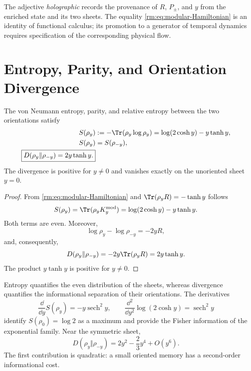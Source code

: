 The adjective \emph{holographic} records the provenance of \(R\),
\(P_\pm\), and \(y\) from the enriched state and its two sheets. The equality
\cref{rm:eq:modular-Hamiltonian} is an identity of functional calculus; its
promotion to a generator of temporal dynamics requires specification of the
corresponding physical flow.

\section{Entropy, Parity, and Orientation Divergence}

\begin{theorem}
\label{rm:thm:modular-information-geometry}
The von Neumann entropy, parity, and relative entropy between the
two orientations satisfy
\begin{align}
 S(\rho_y)
 &:=-\Tr(\rho_y\log\rho_y)
 =\log(2\cosh y)-y\tanh y,
 \label{rm:eq:modular-entropy}\\
 S(\rho_y)&=S(\rho_{-y}),
 \label{rm:eq:modular-entropy-even}\\
 \boxed{
 D(\rho_y\Vert\rho_{-y})
 =2y\tanh y.}
 \label{rm:eq:modular-relative-entropy}
\end{align}
The divergence is positive for \(y\ne0\) and vanishes exactly on the
unoriented sheet \(y=0\).
\end{theorem}

\begin{proof}
From \cref{rm:eq:modular-Hamiltonian} and
\(\Tr(\rho_yR)=-\tanh y\) follows
\[
 S(\rho_y)=\Tr(\rho_yK_y^{\rm mod})
 =\log(2\cosh y)-y\tanh y.
\]
Both terms are even. Moreover,
\[
 \log\rho_y-\log\rho_{-y}=-2yR,
\]
and, consequently,
\[
 D(\rho_y\Vert\rho_{-y})
 =-2y\Tr(\rho_yR)=2y\tanh y.
\]
The product \(y\tanh y\) is positive for \(y\ne0\).
\end{proof}

Entropy quantifies the even distribution of the sheets, whereas
divergence quantifies the informational separation of their orientations.
The derivatives
\begin{equation}
 \frac{\dd}{\dd y}S(\rho_y)=-y\operatorname{sech}^2y,
 \qquad
 \frac{\dd^2}{\dd y^2}\log(2\cosh y)
 =\operatorname{sech}^2y
 \label{rm:eq:modular-entropy-derivatives}
\end{equation}
identify \(S(\rho_0)=\log2\) as a maximum and provide the Fisher information of the exponential family. Near the symmetric sheet,
\begin{equation}
 D(\rho_y\Vert\rho_{-y})
 =2y^2-\frac23y^4+O(y^6).
 \label{rm:eq:modular-relative-expansion}
\end{equation}
The first contribution is quadratic: a small oriented memory
has a second-order informational cost.

